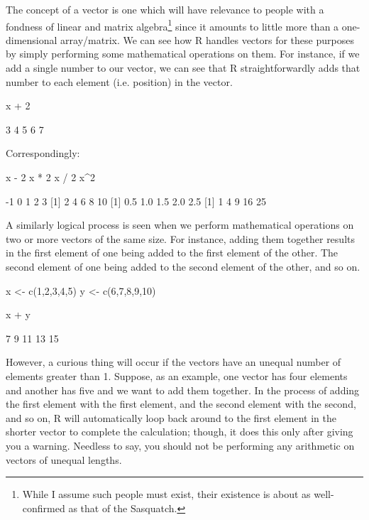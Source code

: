 The concept of a vector is one which will have relevance to people with a fondness of linear and matrix algebra\footnote{While I assume such people must exist, their existence is about as well-confirmed as that of the Sasquatch.} since it amounts to little more than a one-dimensional array/matrix. We can see how R handles vectors for these purposes by simply performing some mathematical operations on them.  For instance, if we add a single number to our vector, we can see that R straightforwardly adds that number to each element (i.e. position) in the vector.

\begin{inR}
x + 2
\end{inR}

\begin{outR}
[1] 3 4 5 6 7
\end{outR}

\noindent
Correspondingly:

\begin{inR}
x - 2
x * 2
x / 2
x^2
\end{inR}

\begin{outR}
[1] -1  0  1  2  3
[1]  2  4  6  8 10
[1] 0.5 1.0 1.5 2.0 2.5
[1]  1  4  9 16 25
\end{outR}

A similarly logical process is seen when we perform mathematical operations on two or more vectors of the same size.  For instance, adding them together results in the first element of one being added to the first element of the other.  The second element of one being added to the second element of the other, and so on.

\begin{inR}
x <- c(1,2,3,4,5)
y <- c(6,7,8,9,10)

x + y
\end{inR}

\begin{outR}
[1]  7  9 11 13 15
\end{outR}

\noindent
However, a curious thing will occur if the vectors have an unequal number of elements greater than 1. Suppose, as an example, one vector has four elements and another has five and we want to add them together. In the process of adding the first element with the first element, and the second element with the second, and so on, R will automatically loop back around to the first element in the shorter vector to complete the calculation; though, it does this only after giving you a warning.  Needless to say, you should not be performing any arithmetic on vectors of unequal lengths.

